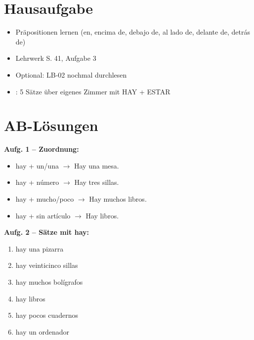 \documentclass[11pt,a4paper]{article}
\begin{document}
\vspace{0.5cm}

\section*{Hausaufgabe}

\begin{itemize}[nosep]
    \item Präpositionen lernen (en, encima de, debajo de, al lado de, delante de, detrás de)
    \item Lehrwerk S. 41, Aufgabe 3
    \item Optional: LB-02 nochmal durchlesen
    \item [E]: 5 Sätze über eigenes Zimmer mit HAY + ESTAR
\end{itemize}

\vspace{0.5cm}

\section*{AB-Lösungen}

\textbf{Aufg. 1 -- Zuordnung:}
\begin{itemize}[nosep]
    \item hay + un/una $\rightarrow$ Hay una mesa.
    \item hay + número $\rightarrow$ Hay tres sillas.
    \item hay + mucho/poco $\rightarrow$ Hay muchos libros.
    \item hay + sin artículo $\rightarrow$ Hay libros.
\end{itemize}

\vspace{0.3cm}

\textbf{Aufg. 2 -- Sätze mit hay:}
\begin{enumerate}[label=\alph*), nosep]
    \item hay una pizarra
    \item hay veinticinco sillas
    \item hay muchos bolígrafos
    \item hay libros
    \item hay pocos cuadernos
    \item hay un ordenador
\end{enumerate}
\end{document}
